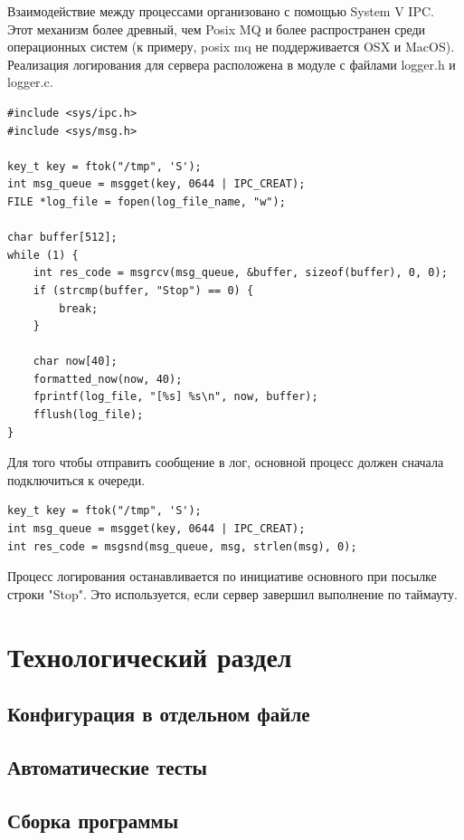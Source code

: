 \documentclass[a4paper,12pt]{report}
\begin{document}
Взаимодействие между процессами организовано с помощью System V IPC. Этот механизм более древный, чем Posix MQ и более распространен среди операционных систем (к примеру, posix mq не поддерживается OSX и MacOS). Реализация логирования для сервера расположена в модуле с файлами logger.h и logger.c.

\begin{verbatim}
#include <sys/ipc.h>
#include <sys/msg.h>

key_t key = ftok("/tmp", 'S');
int msg_queue = msgget(key, 0644 | IPC_CREAT);
FILE *log_file = fopen(log_file_name, "w");

char buffer[512];
while (1) {
    int res_code = msgrcv(msg_queue, &buffer, sizeof(buffer), 0, 0);
    if (strcmp(buffer, "Stop") == 0) {
        break;
    }

    char now[40];
    formatted_now(now, 40);
    fprintf(log_file, "[%s] %s\n", now, buffer);
    fflush(log_file);
}
\end{verbatim}

Для того чтобы отправить сообщение в лог, основной процесс должен сначала подключиться к очереди.
\begin{verbatim}
key_t key = ftok("/tmp", 'S');
int msg_queue = msgget(key, 0644 | IPC_CREAT);
int res_code = msgsnd(msg_queue, msg, strlen(msg), 0);
\end{verbatim}

Процесс логирования останавливается по инициативе основного при посылке строки "Stop". Это используется, если сервер завершил выполнение по таймауту.


\chapter{Технологический раздел}


\section{Конфигурация в отдельном файле}

\section{Автоматические тесты}

\section{Сборка программы}
\end{document}
